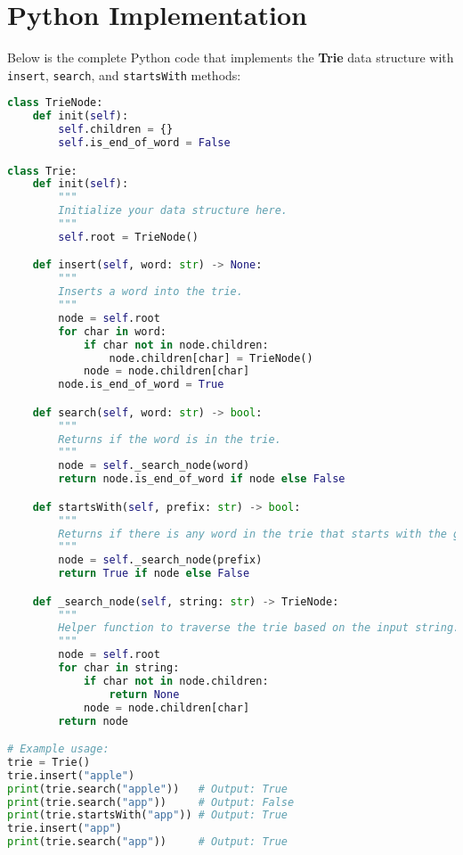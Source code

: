 \section*{Python Implementation}


Below is the complete Python code that implements the \textbf{Trie} data structure with \texttt{insert}, \texttt{search}, and \texttt{startsWith} methods:

\begin{fullwidth}
\begin{lstlisting}[language=Python]
class TrieNode:
    def init(self):
        self.children = {}
        self.is_end_of_word = False

class Trie:
    def init(self):
        """
        Initialize your data structure here.
        """
        self.root = TrieNode()

    def insert(self, word: str) -> None:
        """
        Inserts a word into the trie.
        """
        node = self.root
        for char in word:
            if char not in node.children:
                node.children[char] = TrieNode()
            node = node.children[char]
        node.is_end_of_word = True

    def search(self, word: str) -> bool:
        """
        Returns if the word is in the trie.
        """
        node = self._search_node(word)
        return node.is_end_of_word if node else False

    def startsWith(self, prefix: str) -> bool:
        """
        Returns if there is any word in the trie that starts with the given prefix.
        """
        node = self._search_node(prefix)
        return True if node else False

    def _search_node(self, string: str) -> TrieNode:
        """
        Helper function to traverse the trie based on the input string.
        """
        node = self.root
        for char in string:
            if char not in node.children:
                return None
            node = node.children[char]
        return node

# Example usage:
trie = Trie()
trie.insert("apple")
print(trie.search("apple"))   # Output: True
print(trie.search("app"))     # Output: False
print(trie.startsWith("app")) # Output: True
trie.insert("app")
print(trie.search("app"))     # Output: True
\end{lstlisting}
\end{fullwidth}

